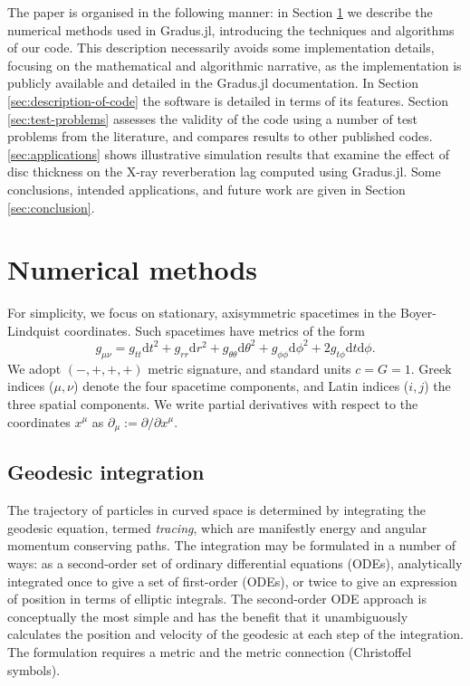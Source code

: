 \documentclass[fleqn,usenatbib]{mnras}
\newcommand{\Gradus}{Gradus.jl\xspace}
\renewcommand{\d}{\text{d}}
\begin{document}
The paper is organised in the following manner: in Section
\ref{sec:numerical-methods} we describe the numerical methods used in \Gradus,
introducing the techniques and algorithms of our code. This description
necessarily avoids some implementation details, focusing on the mathematical and
algorithmic narrative, as the implementation is publicly available and detailed
in the \Gradus documentation. In Section \ref{sec:description-of-code} the
software is detailed in terms of its features. Section \ref{sec:test-problems}
assesses the validity of the code using a number of test problems from the
literature, and compares results to other published codes.
\ref{sec:applications} shows illustrative simulation results that examine the
effect of disc thickness on the X-ray reverberation lag computed using \Gradus.
Some conclusions, intended applications, and future work are given in Section
\ref{sec:conclusion}.

\section{Numerical methods}
\label{sec:numerical-methods}

For simplicity, we focus on stationary, axisymmetric spacetimes in the
Boyer-Lindquist coordinates. Such spacetimes have metrics of the form
\begin{equation}
\label{eq:stationary_axisymmetric_metric}
    g_{\mu\nu}
    = g_{tt} \d t^2
    + g_{rr} \d r^2
    + g_{\theta\theta} \d \theta^2
    + g_{\phi\phi} \d \phi^2
    + 2g_{t\phi} \d t \d \phi.
\end{equation}
We adopt $(-, +, +, +)$ metric signature, and standard units $c = G
= 1$. Greek indices ($\mu, \nu$) denote the four spacetime components, and Latin
indices ($i, j$) the three spatial components. We write partial derivatives with
respect to the coordinates $x^\mu$ as $\partial_\mu := \partial / \partial
x^\mu$.

\subsection{Geodesic integration}

The trajectory of particles in curved space is determined by integrating the
geodesic equation, termed \emph{tracing}, which are manifestly energy and
angular momentum conserving paths. The integration may be formulated in a number
of ways: as a second-order set of ordinary differential equations (ODEs),
analytically integrated once to give a set of first-order (ODEs), or twice to
give an expression of position in terms of elliptic integrals. The second-order
ODE approach is conceptually the most simple and has the benefit that it
unambiguously calculates the position and velocity of the geodesic at each step
of the integration. The formulation requires a metric and
the metric connection (Christoffel symbols).
\end{document}
